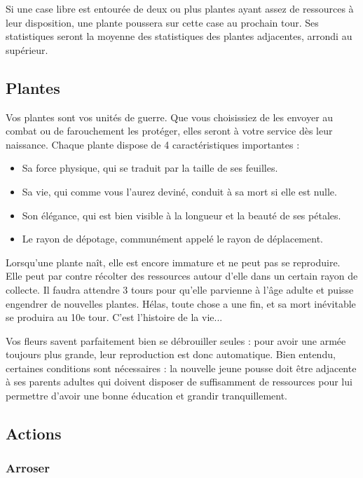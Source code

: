Si une case libre est entourée de deux ou plus plantes ayant assez de ressources à leur disposition, une plante poussera sur cette case au prochain tour. Ses statistiques seront la moyenne des statistiques des plantes adjacentes, arrondi au supérieur.

\subsection{Plantes}

Vos plantes sont vos unités de guerre. Que vous choisissiez de les envoyer au combat ou de farouchement les protéger, elles seront à votre service dès leur naissance. Chaque plante dispose de 4 caractéristiques importantes :
\begin{itemize}
  \item Sa force physique, qui se traduit par la taille de ses feuilles.
  \item Sa vie, qui comme vous l'aurez deviné, conduit à sa mort si elle est nulle.
  \item Son élégance, qui est bien visible à la longueur et la beauté de ses pétales.
  \item Le rayon de dépotage, communément appelé le rayon de déplacement.
\end{itemize}
\vspace{0.3cm}

Lorsqu'une plante naît, elle est encore immature et ne peut pas se reproduire. Elle peut par contre récolter des ressources autour d'elle dans un certain rayon de collecte. Il faudra attendre 3 tours pour qu'elle parvienne à l'âge adulte et puisse engendrer de nouvelles plantes. Hélas, toute chose a une fin, et sa mort inévitable se produira au 10e tour. C'est l'histoire de la vie...

Vos fleurs savent parfaitement bien se débrouiller seules : pour avoir une armée toujours plus grande, leur reproduction est donc automatique. Bien entendu, certaines conditions sont nécessaires : la nouvelle jeune pousse doit être adjacente à ses parents adultes qui doivent disposer de suffisamment de ressources pour lui permettre d'avoir une bonne éducation et grandir tranquillement.


\subsection{Actions}

\subsubsection{Arroser}

